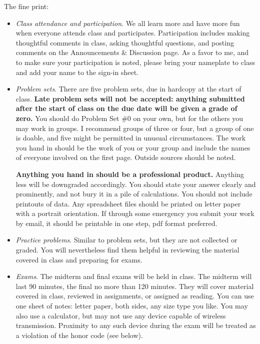 \documentclass[12pt]{article}
\begin{document}
The fine print:
\begin{itemize}

\item \textit{Class attendance and participation}.
We all learn more and have more fun when everyone attends class and participates.
Participation includes making thoughtful comments in class,
asking thoughtful questions,
and posting comments on the Announcements \& Discussion page.
As a favor to me, and to make sure your participation is noted,
please bring your nameplate to class and add your name to the
sign-in sheet.

\item \textit{Problem sets}.
There are five problem sets,
due in hardcopy at the start of class.
{\bf Late problem sets will not be accepted:
anything submitted after the start of class on the due date will be given a grade of zero.}
You should do Problem Set \#0 on your own,
but for the others you may work in groups.
I recommend groups of three or four,
but a group of one is doable, and five might be permitted in unusual circumstances.
The work you hand in should be the work of you or your group
and include the names of everyone involved on the first page.
Outside sources should be noted.

{\bf Anything you hand in should be a  professional product.}
Anything less will be downgraded accordingly.
You should state your answer clearly and prominently,
and not bury it in a pile of calculations.
You should not include printouts of data.
Any spreadsheet files should be printed on letter paper
with a portrait orientation.
If through some emergency you submit your work by email,
it should be printable in one step,
pdf format preferred.

\item \textit{Practice problems}.
Similar to problem sets, but they are not collected or graded.
You will nevertheless find them helpful in reviewing the
material covered in class and preparing for exams.


\item \textit{Exams}.
The midterm and final exams will be held in class.
The midterm will last 90 minutes, the final no more than 120 minutes.
They will cover material covered in class, reviewed in assignments,
or assigned as reading.
You can use one sheet of notes: letter paper, both sides, any size type you like.
You may also use a calculator, but may not use any device
capable of wireless transmission.  Proximity to any such
device during the exam will be treated as a violation of the honor
code (see below).


\end{itemize}
\end{document}
